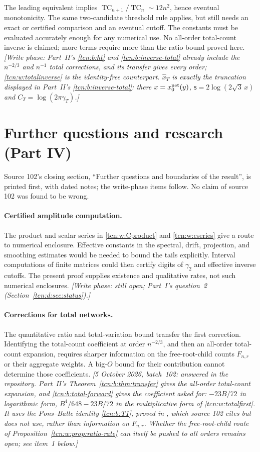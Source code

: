 \documentclass[11pt,letterpaper]{article}
\newcommand{\TC}{\operatorname{TC}}
\theoremstyle{remark}
\begin{document}
The leading equivalent implies $\TC_{n+1}/\TC_n\sim12n^2$, hence eventual monotonicity. The same two-candidate threshold rule applies, but still needs an exact or certified comparison and an eventual cutoff. The constants must be evaluated accurately enough for any numerical use. No all-order total-count inverse is claimed; more terms require more than the ratio bound proved here. \emph{[Write phase: Part~II's \eqref{tcn:b:ht} and \eqref{tcn:b:inverse-total} already include the $n^{-2/3}$ and $n^{-1}$ total corrections, and its transfer gives every order; \eqref{tcn:w:totalinverse} is the identity-free counterpart. $\hat x_T$ is exactly the truncation displayed in Part~II's \eqref{tcn:b:inverse-total}: there $x=x_0^{\rm net}(y)$, $\mathsf s=2\log(2\sqrt3\,x)$ and $C_T=\log(2\pi\gamma_T)$.]}

\section{Further questions and research (Part IV)}\label{tcn:w:sec:questions}
Source 102's closing section, ``Further questions and boundaries of the result'', is printed first, with dated notes; the write-phase items follow. No claim of source 102 was found to be wrong.

\paragraph{Certified amplitude computation.}
The product and scalar series in \eqref{tcn:w:Cproduct} and \eqref{tcn:w:cseries} give a route to numerical enclosure. Effective constants in the spectral, drift, projection, and smoothing estimates would be needed to bound the tails explicitly. Interval computations of finite matrices could then certify digits of $\gamma_2$ and effective inverse cutoffs. The present proof supplies existence and qualitative rates, not such numerical enclosures. \emph{[Write phase: still open; Part~I's question~2 (Section~\ref{tcn:d:sec:status}).]}

\paragraph{Corrections for total networks.}
The quantitative ratio and total-variation bound transfer the first correction. Identifying the total-count coefficient at order $n^{-2/3}$, and then an all-order total-count expansion, requires sharper information on the free-root-child counts $F_{n,r}$ or their aggregate weights. A big-$O$ bound for their contribution cannot determine those coefficients. \emph{[5 October 2026, batch~102: answered in the repository. Part~II's Theorem~\ref{tcn:b:thm:transfer} gives the all-order total-count expansion, and \eqref{tcn:b:total-forward} gives the coefficient asked for: $-23B/72$ in logarithmic form, $B^4/648-23B/72$ in the multiplicative form of \eqref{tcn:w:totalfirst}. It uses the Pons--Batle identity \eqref{tcn:b:T1}, proved in \cite{LL2026}, which source 102 cites but does not use, rather than information on $F_{n,r}$. Whether the free-root-child route of Proposition~\ref{tcn:w:prop:ratio-rate} can itself be pushed to all orders remains open; see item~1 below.]}
\end{document}
